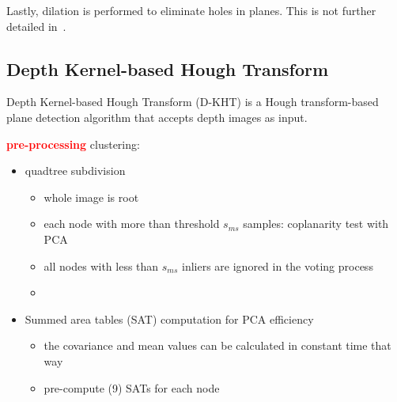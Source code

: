 \documentclass[main.tex]{subfiles}
\begin{document}
Lastly, dilation is performed to eliminate holes in planes. This is not further detailed in~\cite[Section~III.B]{Mols_Li_Hanebeck_2020}.


\subsection{Depth Kernel-based Hough Transform}
Depth Kernel-based Hough Transform (D-KHT) \cite{Vera_Lucio_Fernandes_Velho_2018} is a Hough transform-based plane detection
algorithm that accepts depth images as input.

\textbf{\textcolor{red}{pre-processing}}
clustering:
\begin{itemize}
    \item quadtree subdivision
          \begin{itemize}
              \item whole image is root
              \item each node with more than threshold $s_{ms}$ samples: coplanarity test with PCA
              \item all nodes with less than $s_{ms}$ inliers are ignored in the voting process
              \item
          \end{itemize}
    \item Summed area tables (SAT) computation for PCA efficiency
          \begin{itemize}
              \item the covariance and mean values can be calculated in constant time that way
              \item pre-compute (9) SATs for each node
          \end{itemize}
\end{itemize}
\end{document}
